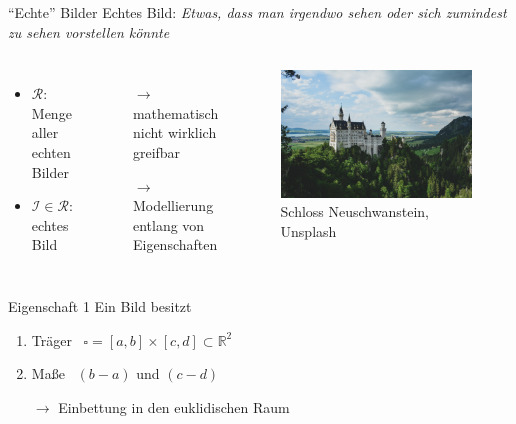 \documentclass[10pt]{beamer}
\newcommand{\R}{\mathbb{R}}
\begin{document}
\begin{frame}{``Echte'' Bilder}
  \alert{Echtes Bild}: \emph{Etwas, dass man irgendwo sehen oder sich zumindest zu sehen vorstellen könnte}

  \begin{columns}[T,onlytextwidth]
      \begin{itemize}
        \item \( \mathcal{R} \): Menge aller echten Bilder
        \item \( \mathcal{I} \in \mathcal{R} \): echtes Bild
      \end{itemize}

      \begin{itemize}
        \pause{}
        \item[\( \to \)] mathematisch nicht wirklich greifbar \\
        \pause{}
        \item[\( \to \)] Modellierung entlang von Eigenschaften
      \end{itemize}
      \pause{}
      \begin{figure}
        \includegraphics[width=\textwidth]{neuschwanstein}
        \caption*{\tiny{Schloss Neuschwanstein, Unsplash}}
      \end{figure}
  \end{columns}
\end{frame}

\begin{frame}{Eigenschaft 1}
  Ein Bild besitzt
  \begin{enumerate}
    \item \alert{Träger} \  \( \square = [a,b] \times [c,d] \subset \R^2 \)
    \item \alert{Maße} \  \( (b-a) \) und \( ( c-d ) \)
  \end{enumerate}

  \begin{itemize}
    \item[\( \to \)] Einbettung in den euklidischen Raum
  \end{itemize}
\end{frame}
\end{document}
